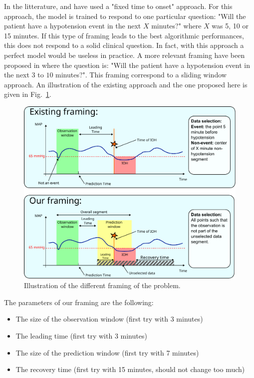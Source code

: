 \documentclass[a4paper,12pt]{article}
\begin{document}
In the litterature, \cite{hatibMachinelearningAlgorithmPredict2018} and \cite{leeDeepLearningModels2021} have used a "fixed time to onset" approach. For this approach, the model is trained to respond to one particular question: "Will the patient have a hypotension event in the next $X$ minutes?" where $X$ was 5, 10 or 15 minutes. If this type of framing leads to the best algorithmic performances, this does not respond to a solid clinical question. In fact, with this approach a perfect model would be useless in practice. A more relevant framing have been proposed in \cite{enevoldsenSelectionBiasHypotension2023} where the question is: "Will the patient have a hypotension event in the next $3$ to $10$ minutes?". This framing correspond to a sliding window approach. An illustration of the existing approach and the one proposed here is given in Fig.~\ref{fig:framing}.

\begin{figure}[h]
    \centering
    \includegraphics[width=\textwidth]{figures/framing.pdf}
    \caption{Illustration of the different framing of the problem.}
    \label{fig:framing}
\end{figure}

The parameters of our framing are the following:
\begin{itemize}
    \item The size of the observation window (first try with 3 minutes)
    \item The leading time (first try with 3 minutes)
    \item The size of the prediction window (first try with 7 minutes)
    \item The recovery time (first try with 15 minutes, should not change too much)
\end{itemize}
\end{document}

